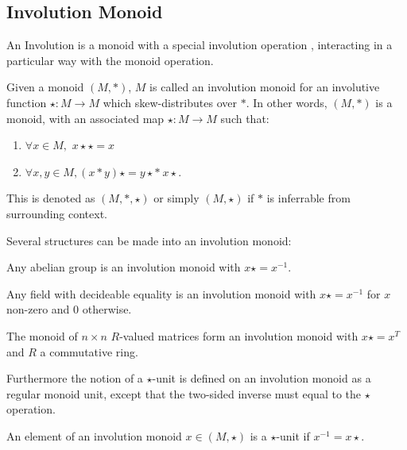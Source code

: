 \subsection{Involution Monoid}
An Involution is a monoid with a special involution operation , interacting in a particular way with the 
monoid operation.
\begin{definition}
  \label{def:involution_monoid}
  \leanok
  Given a monoid $(M,*)$, $M$ is called an involution monoid for an involutive function $\star:M \rightarrow M$
  which skew-distributes over $*$. In other words, $(M,*)$ is a monoid, with an associated map $\star:M \rightarrow M$
  such that:
  \begin{enumerate}
    \item $\forall x \in M,$  $x \star \star = x$ \\
    \item $\forall x, y \in M, (x * y) \star = y \star  * \: x \star$. \\
  \end{enumerate}
  This is denoted as $(M,*,\star)$ or simply $(M,\star)$ if $*$ is inferrable from surrounding context.
\end{definition}
Several structures can be made into an involution monoid:
\begin{proposition}
  \label{prop:inv_monoid_of_abelian_group}
  \leanok
  Any abelian group is an involution monoid with $x\star = x^{-1}$.
\end{proposition}
\begin{proposition}
  \label{prop:inv_monoid_of_field}
  \leanok
  Any field with decideable equality is an involution monoid with $x\star = x^{-1}$ for $x$ non-zero and $0$ otherwise.
\end{proposition}
\begin{proposition}
  \label{prop:sq_matrices_inv_monoid}
  \leanok
  The monoid of $n \times n$ $R$-valued matrices form an involution monoid with $x\star = x^{T}$ and $R$ a commutative ring.
\end{proposition}
Furthermore the notion of a $\star$-unit is defined on an involution monoid as a regular monoid unit, except that the two-sided inverse must
equal to the $\star$ operation.
\begin{definition}
  \label{def:star_unit}
  \leanok
  An element of an involution monoid $x \in (M , \star)$ is a $\star$-unit if $x^{-1} = x\star$.
\end{definition}
